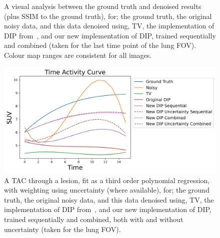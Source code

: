 \begin{figure}
        
        \captionsetup{singlelinecheck=false, justification=centering}
        \caption{
        A visual analysis between the ground truth and denoised results (plus \gls{SSIM} to the ground truth), for; the ground truth, the original noisy data, and this data denoised using, \gls{TV}, the implementation of \gls{DIP} from~\cite{Gong2019PETPrior}, and our new implementation of \gls{DIP}, trained sequentially and combined (taken for the last time point of the lung \gls{FOV}). Colour map ranges are consistent for all images.}
        
        \label{fig:visual_analysis}
        
    \end{figure}
    
    \begin{figure}
        
        \centering
    
        \includegraphics[width=1.0\linewidth]{figures/tac.png}    
        
        
        \captionsetup{singlelinecheck=false, justification=centering}
        \caption{
        A \gls{TAC} through a lesion, fit as a third order polynomial regression, with weighting using uncertainty (where available), for; the ground truth, the original noisy data, and this data denoised using, \gls{TV}, the implementation of \gls{DIP} from~\cite{Gong2019PETPrior}, and our new implementation of \gls{DIP}, trained sequentially and combined, both with and without uncertainty (taken for the lung \gls{FOV}).}
        
        \label{fig:tac}
        
    \end{figure}
    
